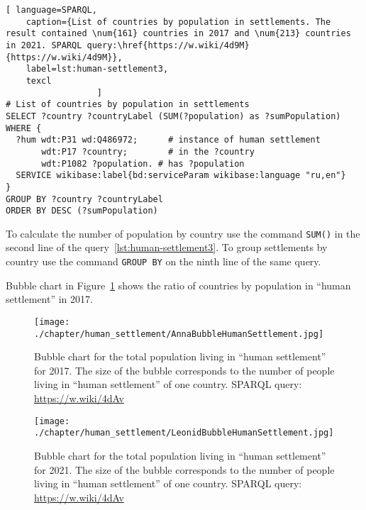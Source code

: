 \lstset{numbers=left, firstnumber=1, frame=single}
\begin{lstlisting}[ language=SPARQL, 
    caption={List of countries by population in settlements. The result contained \num{161} countries in 2017 and \num{213} countries in 2021. SPARQL query:\href{https://w.wiki/4d9M}{https://w.wiki/4d9M}},
    label=lst:human-settlement3,
    texcl 
                  ]
# List of countries by population in settlements
SELECT ?country ?countryLabel (SUM(?population) as ?sumPopulation)
WHERE {
  ?hum wdt:P31 wd:Q486972;  	# instance of human settlement
       wdt:P17 ?country;    	# in the ?country
       wdt:P1082 ?population. # has ?population
  SERVICE wikibase:label{bd:serviceParam wikibase:language "ru,en"}
}
GROUP BY ?country ?countryLabel 
ORDER BY DESC (?sumPopulation)
\end{lstlisting}%

%

To calculate the number of population by country
use the command \lstinline|SUM()| in the second line of the query~\ref{lst:human-settlement3}.
To group settlements by country
use the command \lstinline|GROUP BY| on the ninth line of the same query.

Bubble chart in Figure~\ref{fig:human-settlement-1}
shows the ratio of countries by population in ``human settlement'' in 2017.

\begin{figure}
\centering
	\texttt{[image: ./chapter/human\_settlement/AnnaBubbleHumanSettlement.jpg]}
	\label{fig:human-settlement-1}
    \caption[Bubble chart for the total population in ``human settlement'', 2017.] {Bubble chart for the total population living in ``human settlement'' for 2017. The size of the bubble corresponds to the number of people living in ``human settlement'' of one country. SPARQL query: \href{https://w.wiki/4dAv}{https://w.wiki/4dAv}}
\end{figure}

\begin{figure}
\centering
	\texttt{[image: ./chapter/human\_settlement/LeonidBubbleHumanSettlement.jpg]}
	\label{fig:human-settlement-2}
	\caption[Bubble chart for the total population in ``human settlement'', 2021.] {Bubble chart for the total population living in ``human settlement'' for 2021. The size of the bubble corresponds to the number of people living in ``human settlement'' of one country. SPARQL query: \href{https://w.wiki/4dAv}{https://w.wiki/4dAv}}
\end{figure}

